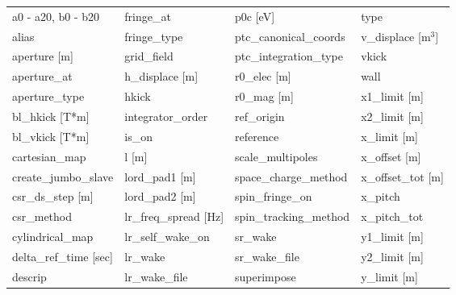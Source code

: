 \begin{tabular}{llll} \toprule
a0 - a20, b0 - b20               & fringe_at                        & p0c [eV]                         & type                             \\
alias                            & fringe_type                      & ptc_canonical_coords             & v_displace [m$^3$]               \\
aperture [m]                     & grid_field                       & ptc_integration_type             & vkick                            \\
aperture_at                      & h_displace [m]                   & r0_elec [m]                      & wall                             \\
aperture_type                    & hkick                            & r0_mag [m]                       & x1_limit [m]                     \\
bl_hkick [T*m]                   & integrator_order                 & ref_origin                       & x2_limit [m]                     \\
bl_vkick [T*m]                   & is_on                            & reference                        & x_limit [m]                      \\
cartesian_map                    & l [m]                            & scale_multipoles                 & x_offset [m]                     \\
create_jumbo_slave               & lord_pad1 [m]                    & space_charge_method              & x_offset_tot [m]                 \\
csr_ds_step [m]                  & lord_pad2 [m]                    & spin_fringe_on                   & x_pitch                          \\
csr_method                       & lr_freq_spread [Hz]              & spin_tracking_method             & x_pitch_tot                      \\
cylindrical_map                  & lr_self_wake_on                  & sr_wake                          & y1_limit [m]                     \\
delta_ref_time [sec]             & lr_wake                          & sr_wake_file                     & y2_limit [m]                     \\
descrip                          & lr_wake_file                     & superimpose                      & y_limit [m]                      \\

\end{tabular}

